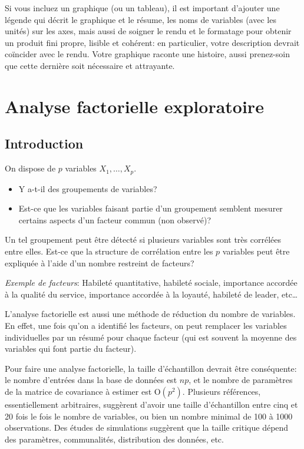 \documentclass[
  11pt,
  letterpaper,
]{book}
\providecommand{\tightlist}{%
  \setlength{\itemsep}{0pt}\setlength{\parskip}{0pt}}
\theoremstyle{definition}
\theoremstyle{definition}
\theoremstyle{definition}
\theoremstyle{definition}
\theoremstyle{remark}
\begin{document}
Si vous incluez un graphique (ou un tableau), il est important d'ajouter une légende qui décrit le graphique et le résume, les noms de variables (avec les unités) sur les axes, mais aussi de soigner le rendu et le formatage pour obtenir un produit fini propre, lisible et cohérent: en particulier, votre description devrait coïncider avec le rendu. Votre graphique raconte une histoire, aussi prenez-soin que cette dernière soit nécessaire et attrayante.

\hypertarget{analyse-factorielle}{%
\chapter{Analyse factorielle exploratoire}\label{analyse-factorielle}}

\hypertarget{introduction-1}{%
\section{Introduction}\label{introduction-1}}

On dispose de \(p\) variables \(X_1, \ldots, X_p\).

\begin{itemize}
\tightlist
\item
  Y a-t-il des groupements de variables?
\item
  Est-ce que les variables faisant partie d'un groupement semblent mesurer certains aspects d'un facteur commun (non observé)?
\end{itemize}

Un tel groupement peut être détecté si plusieurs variables sont très corrélées entre elles. Est-ce que la structure de corrélation entre les \(p\) variables peut être expliquée à l'aide d'un nombre restreint de facteurs?

\emph{Exemple de facteurs}: Habileté quantitative, habileté sociale, importance accordée à la qualité du service, importance accordée à la loyauté, habileté de leader, etc\ldots

L'analyse factorielle est aussi une méthode de réduction du nombre de variables. En effet, une fois qu'on a identifié les facteurs, on peut remplacer les variables individuelles par un résumé pour chaque facteur (qui est souvent la moyenne des variables qui font partie du facteur).

Pour faire une analyse factorielle, la taille d'échantillon devrait être conséquente: le nombre d'entrées dans la base de données est \(np\), et le nombre de paramètres de la matrice de covariance à estimer est \(\mathrm{O}(p^2)\). Plusieurs références, essentiellement arbitraires, suggèrent d'avoir une taille d'échantillon entre cinq et 20 fois le fois le nombre de variables, ou bien un nombre minimal de 100 à 1000 observations. Des études de simulations suggèrent que la taille critique dépend des paramètres, communalités, distribution des données, etc.
\end{document}
